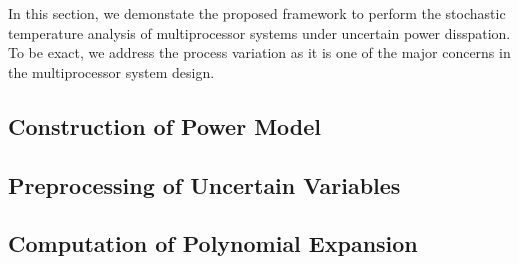 In this section, we demonstate the proposed framework to perform the stochastic temperature analysis of multiprocessor systems under uncertain power disspation. To be exact, we address the process variation as it is one of the major concerns in the multiprocessor system design.

\subsection{Construction of Power Model} 


\subsection{Preprocessing of Uncertain Variables} 


\subsection{Computation of Polynomial Expansion} 

